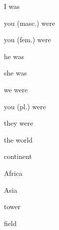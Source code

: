

\begin{flashcard}{\LARGE I was}
\LARGE {}
\end{flashcard}
\begin{flashcard}{\LARGE you (masc.) were}
\LARGE {}
\end{flashcard}
\begin{flashcard}{\LARGE you (fem.) were}
\LARGE {}
\end{flashcard}
\begin{flashcard}{\LARGE he was}
\LARGE {}
\end{flashcard}
\begin{flashcard}{\LARGE she was}
\LARGE {}
\end{flashcard}
\begin{flashcard}{\LARGE we were}
\LARGE {}
\end{flashcard}
\begin{flashcard}{\LARGE you (pl.) were}
\LARGE {}
\end{flashcard}
\begin{flashcard}{\LARGE they were}
\LARGE {}
\end{flashcard}
\begin{flashcard}{\LARGE the world}
\LARGE {}
\end{flashcard}
\begin{flashcard}{\LARGE continent}
\LARGE {}
\end{flashcard}
\begin{flashcard}{\LARGE Africa}
\LARGE {}
\end{flashcard}
\begin{flashcard}{\LARGE Asia}
\LARGE {}
\end{flashcard}
\begin{flashcard}{\LARGE tower}
\LARGE {}
\end{flashcard}
\begin{flashcard}{\LARGE field}
\LARGE {}
\end{flashcard}
